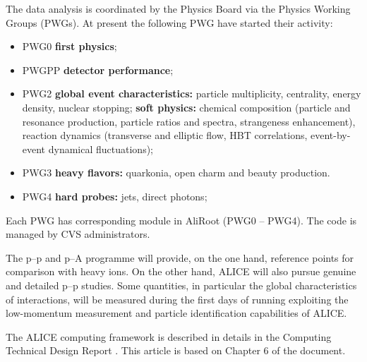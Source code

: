 \documentclass[12pt,a4paper,twoside]{article}
\makeatletter
\newcommand {\pp} {\mbox{p--p}\@\xspace}
\newcommand {\pA} {\mbox{p--A}\@\xspace}
\makeatother
\begin{document}
The data analysis is coordinated by the Physics Board via the Physics
Working Groups (PWGs). At present the following PWG have started
their activity: 

\begin{itemize}
\item PWG0 \textbf{first physics};
\item PWGPP \textbf{detector performance};
\item PWG2 \textbf{global event characteristics:}  particle multiplicity,
  centrality, energy density, nuclear stopping; \textbf{soft physics:} chemical composition (particle and resonance
  production, particle ratios and spectra, strangeness enhancement),
  reaction dynamics (transverse and elliptic flow, HBT correlations,
  event-by-event dynamical fluctuations);
\item PWG3 \textbf{heavy flavors:} quarkonia, open charm and beauty production.
\item PWG4 \textbf{hard probes:} jets, direct photons;
\end{itemize}

Each PWG has corresponding module in AliRoot (PWG0 -- PWG4). The code
is managed by CVS administrators.

The \pp and \pA programme will provide, on the one hand, reference points
for comparison with heavy ions. On the other hand, ALICE will also
pursue genuine and detailed \pp studies. Some
quantities, in particular the global characteristics of interactions, will
be measured during the first days of running exploiting the low-momentum
measurement and particle identification capabilities of ALICE.

The ALICE computing framework is described in details in the Computing
Technical Design Report \cite{CompTDR}. This article is based on
Chapter 6 of the document.

\noindent
\end{document}
